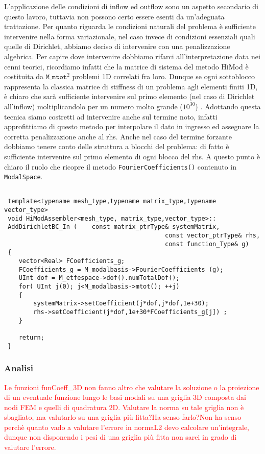 L'applicazione delle condizioni di inflow ed outflow sono un aspetto secondario di questo lavoro, tuttavia non possono certo essere esenti da un'adeguata trattazione. Per quanto riguarda le condizioni naturali del problema \`e sufficiente intervenire nella forma variazionale, nel caso invece di condizioni essenziali quali quelle di Dirichlet, abbiamo deciso di intervenire con una penalizzazione algebrica. Per capire dove intervenire dobbiamo rifarci all'interpretazione data nei cenni teorici, ricordiamo infatti che la matrice di sistema del metodo HiMod \`e costituita da $\texttt{M\_mtot}^2$ problemi 1D correlati fra loro. Dunque se ogni sottoblocco rappresenta la classica matrice di stiffness di un problema agli elementi finiti 1D, \`e chiaro che sar\`a sufficiente intervenire sul primo elemento (nel caso di Dirichlet all'inflow) moltiplicandolo per un numero molto grande ($10^{30}$) . Adottando questa tecnica siamo costretti ad intervenire anche sul termine noto, infatti approfittiamo di questo metodo per interpolare il dato in ingresso ed assegnare la corretta penalizzazione anche al rhs. Anche nel caso del termine forzante dobbiamo tenere conto delle struttura a blocchi del problema: di fatto \`e sufficiente intervenire sul primo elemento di ogni blocco del rhs. A questo punto \`e chiaro il ruolo che ricopre il metodo \texttt{FourierCoefficients()} contenuto in \texttt{ModalSpace}.

\begin{lstlisting}[style = general]

 template<typename mesh_type,typename matrix_type,typename vector_type>
 void HiModAssembler<mesh_type, matrix_type,vector_type>::
 AddDirichletBC_In (	const matrix_ptrType& systemMatrix,
 											const vector_ptrType& rhs,
 											const function_Type& g)
 {
 	vector<Real> FCoefficients_g;
 	FCoefficients_g = M_modalbasis->FourierCoefficients (g);
 	UInt dof = M_etfespace->dof().numTotalDof();
 	for( UInt j(0); j<M_modalbasis->mtot(); ++j)
 	{
		systemMatrix->setCoefficient(j*dof,j*dof,1e+30);
		rhs->setCoefficient(j*dof,1e+30*FCoefficients_g[j]) ;
 	}
 	
 	return;
 }
\end{lstlisting}

\subsubsection{Analisi}

\textcolor{red}{Le funzioni funCoeff\_3D non fanno altro che valutare la soluzione o la proiezione di un eventuale funzione lungo le basi modali su una griglia 3D composta dai nodi FEM e quelli di quadratura 2D. Valutare la norma su tale griglia non \`e sbagliato, ma valutarlo su una griglia pi\`u fitta?Ha senso farlo?Non ha senso perch\`e quanto vado a valutare l'errore in normaL2 devo calcolare un'integrale, dunque non disponendo i pesi di una griglia pi\`u fitta non sarei in grado di valutare l'errore.}

